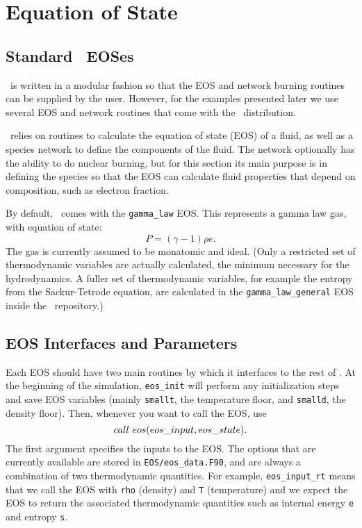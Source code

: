 \section{Equation of State}

\subsection{Standard \castro\ EOSes}

\castro\ is written in a modular fashion so that the EOS and network
burning routines can be supplied by the user. However, for the
examples presented later we use several EOS and network routines
that come with the \microphysics\ distribution.

\castro\ relies on routines to calculate the equation of state (EOS)
of a fluid, as well as a species network to define the components of
the fluid. The network optionally has the ability to do nuclear burning,
but for this section its main purpose is in defining the species so that
the EOS can calculate fluid properties that depend on composition, such
as electron fraction.

By default, \castro\ comes with the {\tt gamma\_law}
EOS. This represents a gamma law gas, with equation of state:
\begin{equation}
  P = (\gamma - 1) \rho e.
\end{equation}
The gas is currently assumed to be monatomic and ideal. (Only a 
restricted set of thermodynamic variables are actually calculated, 
the minimum necessary for the hydrodynamics. A fuller set of 
thermodynamic variables, for example the entropy from the 
Sackur-Tetrode equation, are calculated in the {\tt gamma\_law\_general}
EOS inside the \microphysics\ repository.)

\subsection{EOS Interfaces and Parameters}

Each EOS should have two main routines by which it interfaces to the
rest of \castro.  At the beginning of the simulation, {\tt eos\_init}
will perform any initialization steps and save EOS variables (mainly
\texttt{smallt}, the temperature floor, and \texttt{smalld}, the
density floor). Then, whenever you want to call the EOS, use
\[
  {\tt call\ eos (eos\_input, eos\_state)}.
\]
The first argument specifies the inputs to the EOS. The options
that are currently available are stored in
{\tt EOS/eos\_data.F90}, and are always a combination of two
thermodynamic quantities. For example, {\tt eos\_input\_rt} means
that we call the EOS with {\tt rho} (density) and {\tt T} (temperature)
and we expect the EOS to return the associated thermodynamic
quantities such as internal energy {\tt e} and entropy {\tt s}.

